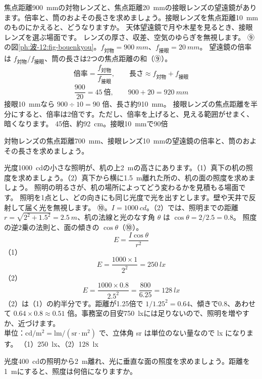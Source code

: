 \label{ph:波-12:ex12}
\begin{phreidai}[望遠鏡の倍率と長さ]
焦点距離\qty{900}{mm}の対物レンズと、焦点距離\qty{20}{mm}の接眼レンズの望遠鏡があります。倍率と、筒のおよその長さを求めましょう。接眼レンズを焦点距離\qty{10}{mm}のものにかえると、どうなりますか。
\phbamen
天体望遠鏡で月や木星を見るとき、接眼レンズを選ぶ場面です。
\phmushi
レンズの厚さ、収差、空気のゆらぎを無視します。
\phzu
⑨の図\ref{ph:波-12:fig-bouenkyou}。$f_{\text{対物}}=\qty{900}{mm}$、$f_{\text{接眼}}=\qty{20}{mm}$。
\phriyu
望遠鏡の倍率は $f_{\text{対物}}/f_{\text{接眼}}$、筒の長さは2つの焦点距離の和（⑨）。
\phtateru
\[\text{倍率}=\frac{f_{\text{対物}}}{f_{\text{接眼}}},\qquad\text{長さ}\approx f_{\text{対物}}+f_{\text{接眼}}\]
\phtoku
\[\frac{900}{20}=45\ \text{倍},\qquad900+20=\qty{920}{mm}\]
接眼\qty{10}{mm}なら $900\div10=90$ 倍、長さ約\qty{910}{mm}。
\phtashikame
接眼レンズの焦点距離を半分にすると、倍率は2倍です。ただし、倍率を上げると、見える範囲がせまく、暗くなります。
\kotae 45倍、約\qty{92}{cm}。接眼\qty{10}{mm}で90倍
\end{phreidai}
\begin{jibun}
対物レンズの焦点距離\qty{700}{mm}、接眼レンズ\qty{10}{mm}の望遠鏡の倍率と、筒のおよその長さを求めましょう。
\end{jibun}

\label{ph:波-12:ex13}
\begin{phreidai}[机の上の照度]
光度\qty{1000}{cd}の小さな照明が、机の上\qty{2}{m}の高さにあります。（1）真下の机の照度を求めましょう。（2）真下から横に\qty{1.5}{m}離れた所の、机の面の照度を求めましょう。
\phbamen
照明の明るさが、机の場所によってどう変わるかを見積もる場面です。
\phmushi
照明を1点とし、どの向きにも同じ光度で光を出すとします。壁や天井で反射して届く光を無視します。
\phzu
⑩。$I=\qty{1000}{cd}$。（2）では、照明までの距離 $r=\sqrt{2^2+1.5^2}=\qty{2.5}{m}$、机の法線と光のなす角 $\theta$ は $\cos\theta=2/2.5=0.8$。
\phriyu
照度の逆2乗の法則と、面の傾きの $\cos\theta$（⑩）。
\phtateru
\[E=\frac{I\cos\theta}{r^2}\]
\phtoku
（1）\[E=\frac{1000\times1}{2^2}=\qty{250}{lx}\]
（2）\[E=\frac{1000\times0.8}{2.5^2}=\frac{800}{6.25}=\qty{128}{lx}\]
\phtashikame
（2）は（1）の約半分です。距離が1.25倍で $1/1.25^2=0.64$、傾きで0.8、あわせて $0.64\times0.8\approx0.51$ 倍。事務室の目安\qty{750}{lx}には足りないので、照明を増やすか、近づけます。\\
単位：$\text{cd}/\text{m}^2=\text{lm}/(\text{sr}\cdot\text{m}^2)$ で、立体角 sr は単位のない量なので lx になります。
\kotae （1）\qty{250}{lx}、（2）\qty{128}{lx}
\end{phreidai}
\begin{jibun}
光度\qty{400}{cd}の照明から\qty{2}{m}離れ、光に垂直な面の照度を求めましょう。距離を\qty{1}{m}にすると、照度は何倍になりますか。
\end{jibun}

